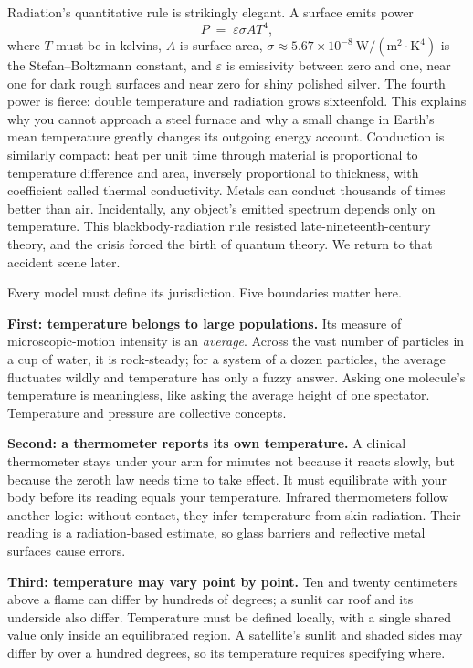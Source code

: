 \begin{mathbridge}
Radiation's quantitative rule is strikingly elegant. A surface emits power
\[
P \;=\; \varepsilon \sigma A T^{4},
\]
where \(T\) must be in kelvins, \(A\) is surface area, \(\sigma \approx 5.67\times10^{-8}\ \mathrm{W/(m^{2}\cdot K^{4})}\) is the Stefan--Boltzmann constant, and \(\varepsilon\) is emissivity between zero and one, near one for dark rough surfaces and near zero for shiny polished silver. The fourth power is fierce: double temperature and radiation grows sixteenfold. This explains why you cannot approach a steel furnace and why a small change in Earth's mean temperature greatly changes its outgoing energy account. Conduction is similarly compact: heat per unit time through material is proportional to temperature difference and area, inversely proportional to thickness, with coefficient called thermal conductivity. Metals can conduct thousands of times better than air. Incidentally, any object's emitted spectrum depends only on temperature. This blackbody-radiation rule resisted late-nineteenth-century theory, and the crisis forced the birth of quantum theory. We return to that accident scene later.
\end{mathbridge}


Every model must define its jurisdiction. Five boundaries matter here.

\textbf{First: temperature belongs to large populations.} Its measure of microscopic-motion intensity is an \emph{average}. Across the vast number of particles in a cup of water, it is rock-steady; for a system of a dozen particles, the average fluctuates wildly and temperature has only a fuzzy answer. Asking one molecule's temperature is meaningless, like asking the average height of one spectator. Temperature and pressure are collective concepts.

\textbf{Second: a thermometer reports its own temperature.} A clinical thermometer stays under your arm for minutes not because it reacts slowly, but because the zeroth law needs time to take effect. It must equilibrate with your body before its reading equals your temperature. Infrared thermometers follow another logic: without contact, they infer temperature from skin radiation. Their reading is a radiation-based estimate, so glass barriers and reflective metal surfaces cause errors.

\textbf{Third: temperature may vary point by point.} Ten and twenty centimeters above a flame can differ by hundreds of degrees; a sunlit car roof and its underside also differ. Temperature must be defined locally, with a single shared value only inside an equilibrated region. A satellite's sunlit and shaded sides may differ by over a hundred degrees, so its temperature requires specifying where.

